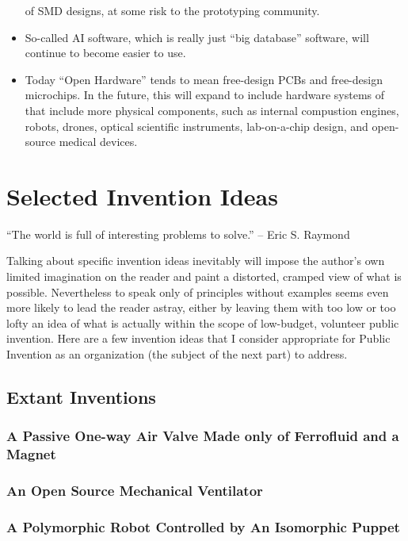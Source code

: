 \documentclass[
	fontsize=10pt, %
	twoside=false, %
	secnumdepth=1, %
]{kaobook}
\begin{document}
\begin{itemize}
  of SMD designs, at some risk to the prototyping community.
\item So-called AI software, which is really just ``big database'' software,
  will continue to become easier to use.
\item Today ``Open Hardware'' tends to mean free-design PCBs and free-design
  microchips. In the future, this will expand to include hardware systems
  of that include more physical components, such as internal compustion engines,
  robots, drones, optical scientific instruments, lab-on-a-chip design, and
  open-source medical devices.
\end{itemize}

\chapter{Selected Invention Ideas}

``The world is full of interesting problems to solve.'' -- Eric S. Raymond

Talking about specific invention ideas inevitably will impose the author's own limited
imagination on the reader and paint a distorted, cramped view of what is possible.
Nevertheless to speak only of principles without examples seems even more
likely to lead the reader astray, either by leaving them with too low or too lofty
an idea of what is actually within the scope of low-budget, volunteer public invention.
Here are a few invention ideas that I consider appropriate for Public Invention
as an organization (the subject of the next part) to address.

\section{Extant Inventions}
\subsection{A Passive One-way Air Valve Made only of Ferrofluid and a Magnet}

\subsection{An Open Source Mechanical Ventilator}

\subsection{A Polymorphic Robot Controlled by An Isomorphic Puppet}
\end{document}
